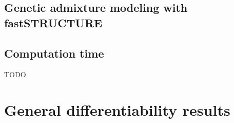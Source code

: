 \documentclass[ba]{imsart}
\begin{document}
    \subsection{Genetic admixture modeling with fastSTRUCTURE}
    

    \subsection{Computation time}
    






\begin{acks}[Acknowledgments]
  TODO
\end{acks}



\appendix

% 

\section{General differentiability results}

\end{document}
